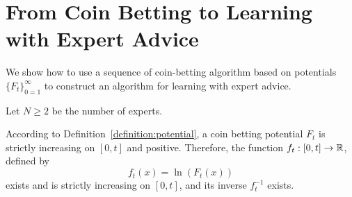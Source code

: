 \section{From Coin Betting to Learning with Expert Advice}

We show how to use a sequence of coin-betting algorithm based on potentials
$\{F_t\}_{0=1}^\infty$ to construct an algorithm for learning with expert
advice.

Let $N \ge 2$ be the number of experts.

According to Definition~\ref{definition:potential}, a coin betting potential
$F_t$ is strictly increasing on $[0,t]$ and positive. Therefore,
the function $f_t:[0,t] \to \mathbb{R}$, defined by
$$
f_t(x) = \ln \left(F_t(x)\right)
$$
exists and is strictly increasing on $[0, t]$, and its inverse $f_t^{-1}$
exists.
